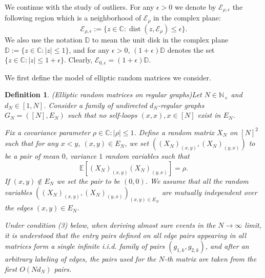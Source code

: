 \documentclass[11pt,reqno]{amsart}
\theoremstyle{plain}
\newtheorem{Definition}[theorem]{Definition}
\theoremstyle{remark}
\numberwithin{equation}{section}
\begin{document}
We continue with the study of outliers. For any $\epsilon>0$ we denote by $\mathcal{E}_{\rho,\epsilon}$ the following region which is a neighborhood of $\mathcal{E}_\rho$ in the complex plane: 
$$
\mathcal{E}_{\rho,\epsilon}:=\{z\in\mathbb{C}:\operatorname{dist}(z,\mathcal{E}_\rho)\leq\epsilon\}.
$$ We also use the notation $\mathbb{D}$ to mean the unit disk in the complex plane $\mathbb{D}:=\{z\in\mathbb{C}:|z|\leq 1\}$, and for any $\epsilon>0$, $(1+\epsilon)\mathbb{D}$ denotes the set $\{z\in\mathbb{C}:|z|\leq 1+\epsilon\}$. Clearly, $\mathcal{E}_{0,\epsilon}=(1+\epsilon)\mathbb{D}$.

We first define the model of elliptic random matrices we consider.

\begin{Definition}(Elliptic random matrices on regular graphs)\label{ellipticdef}
    Let $N\in\mathbb{N}_+$ and $d_N\in[1,N]$. Consider a family of undirected $d_N$-regular graphs $G_N=([N],E_N)$ such that no self-loops $(x,x),x\in[N]$ exist in $E_N$.  


Fix a covariance parameter $\rho\in\mathbb{C}:|\rho|\leq 1$.
Define a random matrix $X_N$ on $[N]^2$ such that for any $x<y$, $(x,y)\in E_N$, we set $((X_N)_{(x,y)},(X_N)_{(y,x)})$ to be a pair of mean $0$, variance $1$ random variables such that $$\mathbb{E}[(X_N)_{(x,y)}(X_N)_{(y,x)}]=\rho.$$
If $(x,y)\notin E_N$ we set the pair to be $(0,0)$. We assume that all the random variables $((X_N)_{(x,y)},(X_N)_{(y,x)})_{(x,y)\in E_N}$ are mutually independent over the edges $(x,y)\in E_N$. 

Under condition (3) below, when deriving almost sure events in the $N\to\infty$ limit, it is understood that the entry pairs defined on all edge pairs appearing in all matrices form a single infinite i.i.d. family of pairs $(g_{1,k},g_{2,k})$, and after an arbitrary labeling of edges, the pairs used for the $N$-th matrix are taken from the first $O(Nd_N)$ pairs.

\end{Definition}
\end{document}
